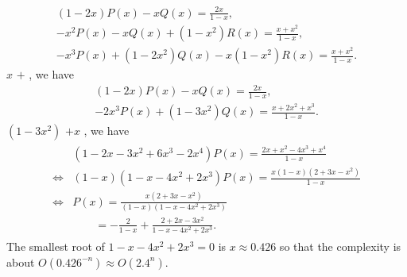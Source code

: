 \documentclass{../../cls/sig-alternate-05-2015}
\begin{document}
\begin{enumerate}[label=(\alph*)]
    \begin{subequations}
        \label{eq:6-2-c-11}
        \begin{align}
        (1 - 2x)P(x) - xQ(x) = \frac{2x}{1 - x},\\
        -x^2P(x) - xQ(x) + (1 - x^2)R(x) = \frac{x + x^2}{1 - x},\label{eq:6-2-c-11:b}\\
        -x^3P(x) + (1 - 2x^2)Q(x) - x(1 - x^2)R(x) = \frac{x + x^2}{1 - x}.\label{eq:6-2-c-11:c}
        \end{align}
    \end{subequations}
    $x$ $+$ , we have
    \begin{subequations}
        \label{eq:6-2-c-12}
        \begin{align}
        (1 - 2x)P(x) - xQ(x) = \frac{2x}{1 - x},\label{eq:6-2-c-12:a}\\
        -2x^3P(x) + (1 - 3x^2)Q(x) = \frac{x + 2x^2 + x^3}{1 - x}\label{eq:6-2-c-12:b}.
        \end{align}
    \end{subequations}
    $(1 - 3x^2)$ $+ x$ , we have
    \begin{align}
        \begin{aligned}
        & (1 - 2x - 3x^2 + 6x^3 - 2x^4)P(x) = \frac{2x + x^2 - 4x^3 + x^4}{1 - x}\\
        \Leftrightarrow & (1 - x)(1 - x - 4x^2 + 2x^3)P(x) = \frac{x(1 - x)(2 + 3x - x^2)}{1 - x}\\
        \Leftrightarrow & P(x) = \frac{x(2 + 3x - x^2)}{(1 - x)(1 - x - 4x^2 + 2x^3)}\\
        & \qquad = - \frac{2}{1 - x} + \frac{2 + 2x - 3x^2}{1 - x - 4x^2 + 2x^3}.
        \end{aligned}
    \end{align} The smallest root of $1 - x - 4x^2 + 2x^3 = 0$ is $x \approx 0.426$ so that the complexity is about $O(0.426^{-n}) \approx O(2.4^n)$.
\end{enumerate}
\end{document}
